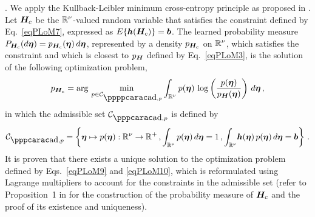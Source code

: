 .
We apply the Kullback-Leibler minimum cross-entropy principle as proposed in \cite{Soize2020a,Soize2022b}.
Let ${\boldsymbol{H}}_c$ be the ${\mathbb{R}}^\nu$-valued random variable that satisfies the constraint defined by Eq.~\eqref{eqPLoM7}, expressed as $E\{{\boldsymbol{h}}({\boldsymbol{H}}_c)\} = {\boldsymbol{b}}$. The learned probability measure $P_{{\boldsymbol{H}}_c}(d{\boldsymbol{\eta}}) = p_{{\boldsymbol{H}}_c}({\boldsymbol{\eta}}) \, d{\boldsymbol{\eta}}$, represented by a density $p_{{\boldsymbol{H}}_c}$ on ${\mathbb{R}}^\nu$, which satisfies the constraint  and which is closest to $p_{\boldsymbol{H}}$ defined by Eq.~\eqref{eqPLoM3}, is the solution of the following optimization problem,
%
\begin{equation}\label{eqPLoM9}
p_{\bfH_c} = \arg\,\min_{p\in\curC_{\adp,p}} \int_{\RR^\nu} p(\bfeta)\, \log\left (\frac{p(\bfeta)}{p_\bfH(\bfeta)}\right) \, d\bfeta \, ,
\end{equation}
%
in which the admissible set $\curC_{\ad,p}$ is defined by
%
\begin{equation}\label{eqPLoM10}
\curC_{\ad,p} = \left\{\bfeta\mapsto p(\bfeta):\RR^\nu\rightarrow \RR^+ \, ,\int_{\RR^\nu} p(\bfeta)\, d\bfeta =1\, ,
\int_{\RR^\nu} \!\bfh(\bfeta)\, p(\bfeta)\, d\bfeta = \bfb \right\} \, .
\end{equation}
%
It is proven  that there exists a unique solution to the optimization problem defined by Eqs.~\eqref{eqPLoM9} and \eqref{eqPLoM10}, which is reformulated using Lagrange multipliers to account for the constraints in the admissible set (refer to Proposition~1 in \cite{Soize2022b} for the construction of the probability measure of ${\boldsymbol{H}}_c$ and the proof of its existence and uniqueness). \\


